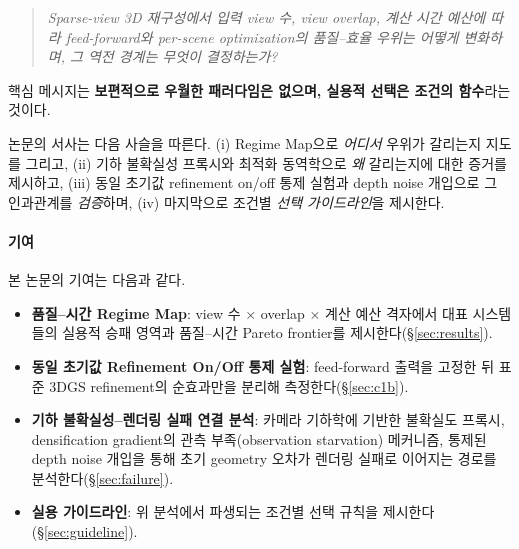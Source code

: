 \begin{quote}
\emph{Sparse-view 3D 재구성에서 입력 view 수, view overlap, 계산 시간 예산에 따라 feed-forward와 per-scene optimization의 품질--효율 우위는 어떻게 변화하며, 그 역전 경계는 무엇이 결정하는가?}
\end{quote}

핵심 메시지는 \textbf{보편적으로 우월한 패러다임은 없으며, 실용적 선택은 조건의 함수}라는 것이다.

논문의 서사는 다음 사슬을 따른다. (i) Regime Map으로 \emph{어디서} 우위가 갈리는지 지도를 그리고, (ii) 기하 불확실성 프록시와 최적화 동역학으로 \emph{왜} 갈리는지에 대한 증거를 제시하고, (iii) 동일 초기값 refinement on/off 통제 실험과 depth noise 개입으로 그 인과관계를 \emph{검증}하며, (iv) 마지막으로 조건별 \emph{선택 가이드라인}을 제시한다.

\paragraph{기여} 본 논문의 기여는 다음과 같다.
\begin{itemize}
  \item \textbf{품질--시간 Regime Map}: view 수 $\times$ overlap $\times$ 계산 예산 격자에서 대표 시스템들의 실용적 승패 영역과 품질--시간 Pareto frontier를 제시한다(\S\ref{sec:results}).
  \item \textbf{동일 초기값 Refinement On/Off 통제 실험}: feed-forward 출력을 고정한 뒤 표준 3DGS refinement의 순효과만을 분리해 측정한다(\S\ref{sec:c1b}).
  \item \textbf{기하 불확실성--렌더링 실패 연결 분석}: 카메라 기하학에 기반한 불확실도 프록시, densification gradient의 관측 부족(observation starvation) 메커니즘, 통제된 depth noise 개입을 통해 초기 geometry 오차가 렌더링 실패로 이어지는 경로를 분석한다(\S\ref{sec:failure}).
  \item \textbf{실용 가이드라인}: 위 분석에서 파생되는 조건별 선택 규칙을 제시한다(\S\ref{sec:guideline}).
\end{itemize}
